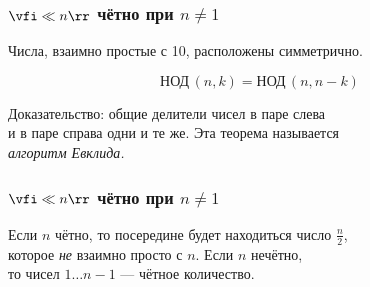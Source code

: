\begin{frame} \frametitle{$\vfi\ll n \rr$ чётно при $n \ne 1$}
   \begin{center}  \end{center}

	Числа, взаимно простые с 10, расположены симметрично.\\ [0.8cm] \pause

	\begin{theorem} \vspace{-4.5mm} \[ \text{НОД}\,(n,k) = \text{НОД}\,(n,n-k) \] \vspace{-5mm} \end{theorem} \vspace{-2mm}

	Доказательство: общие делители чисел в паре слева\\
	и в паре справа одни и те же. Эта теорема называется\\
	{\it алгоритм Евклида.}
\end{frame}

\begin{frame} \frametitle{$\vfi\ll n \rr$ чётно при $n \ne 1$}
   \begin{center}  \end{center}

	Если $n$ чётно, то посередине будет находиться число $\frac{n}{2}$,\\
	которое {\it не} взаимно просто с $n$. Если $n$ нечётно,\\
	то чисел $1 \ldots n-1$ — чётное количество.
\end{frame}
